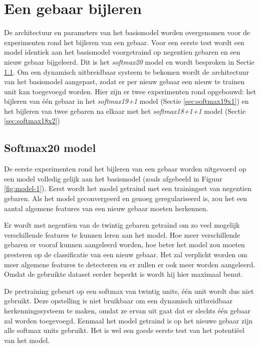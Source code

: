 \section{Een gebaar bijleren}\label{sec:experimenten}

De architectuur en parameters van het basismodel worden overgenomen voor de experimenten rond het bijleren van een gebaar. Voor een eerste test wordt een model identiek aan het basismodel voorgetraind op negentien gebaren en een nieuw gebaar bijgeleerd. Dit is het \textit{softmax20} model en wordt besproken in Sectie \ref{sec:softmax20}.
\npar Om een dynamisch uitbreidbaar systeem te bekomen wordt de architectuur van het basismodel aangepast, zodat er per nieuw gebaar een nieuw te trainen unit kan toegevoegd worden. Hier zijn er twee experimenten rond opgebouwd: het bijleren van \'e\'en gebaar in het \textit{softmax19+1} model (Sectie \ref{sec:softmax19x1}) en het bijleren van twee gebaren na elkaar met het \textit{softmax18+1+1} model (Sectie \ref{sec:softmax18x2})

\subsection{Softmax20 model}\label{sec:softmax20}

De eerste experimenten rond het bijleren van een gebaar worden uitgevoerd op een model volledig gelijk aan het basismodel (zoals afgebeeld in Figuur \ref{fig:model-1}). Eerst wordt het model getraind met een trainingset van negentien gebaren. Als het model geconvergeerd en genoeg geregulariseerd is, zou het een aantal algemene features van een nieuw gebaar moeten herkennen.

\npar Er wordt met negentien van de twintig gebaren getraind om zo veel mogelijk verschillende features te kunnen leren aan het model. Hoe meer verschillende gebaren er vooraf kunnen aangeleerd worden, hoe beter het model zou moeten presteren op de classificatie van een nieuw gebaar. Het zal verplicht worden om meer algemene features te detecteren en er zullen er ook meer worden aangeleerd. Omdat de gebruikte dataset eerder beperkt is wordt hij hier maximaal benut.

\npar De pretraining gebeurt op een softmax van twintig units, \'e\'en unit wordt dus niet gebruikt. Deze opstelling is niet bruikbaar om een dynamisch uitbreidbaar herkenningssysteem te maken, omdat ze ervan uit gaat dat er slechts \'e\'en gebaar zal worden toegevoegd. Eenmaal het model getraind is op het nieuwe gebaar zijn alle softmax units gebruikt. Het is wel een goede eerste test van het potenti\"eel van het model.

